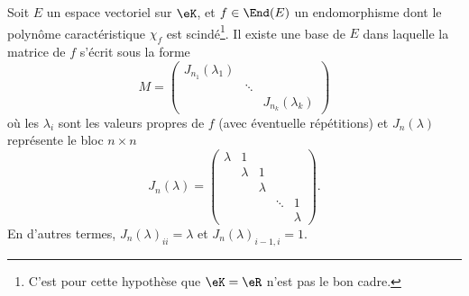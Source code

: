 \begin{theorem}        \label{ThoGGMYooPzMVpe}
    Soit \( E\) un espace vectoriel sur \( \eK\), et \( f\in\End(E)\) un endomorphisme dont le polynôme caractéristique \( \chi_f\) est scindé\footnote{C'est pour cette hypothèse que \( \eK=\eR\) n'est pas le bon cadre.}. Il existe une base de \( E\) dans laquelle la matrice de \( f\) s'écrit sous la forme
    \begin{equation}
        M=\begin{pmatrix}
            J_{n_1}(\lambda_1)    &       &       \\
                &   \ddots    &       \\
                &       &   J_{n_k}(\lambda_k)
        \end{pmatrix}
    \end{equation}
    où les \( \lambda_i\) sont les valeurs propres de \( f\) (avec éventuelle répétitions) et \( J_n(\lambda)\) représente le bloc \( n\times n\)
    \begin{equation}
        J_n(\lambda)=\begin{pmatrix}
            \lambda    &   1    &       &       &   \\
                &   \lambda    &   1    &       &   \\
                &       &   \lambda    &       &   \\
                &       &       &   \ddots    &   1\\
                &       &       &       &   \lambda
        \end{pmatrix}.
    \end{equation}
    En d'autres termes, \( J_n(\lambda)_{ii}=\lambda\) et \( J_n(\lambda)_{i-1,i}=1\).
\end{theorem}

